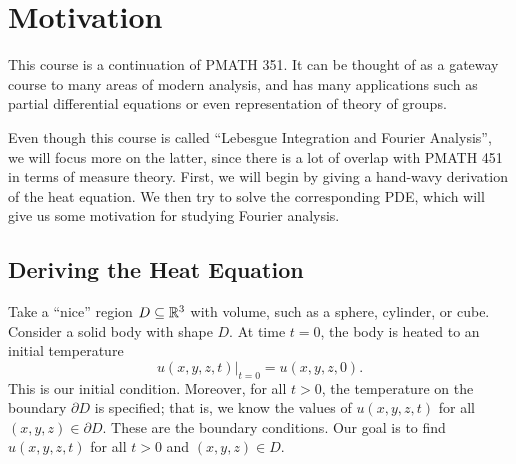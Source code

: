 \section{Motivation}\label{sec:1}
This course is a continuation of PMATH 351. It can be thought of 
as a gateway course to many areas of modern analysis, and has 
many applications such as partial differential equations or even
representation of theory of groups.

Even though this course is called ``Lebesgue Integration and Fourier Analysis'',
we will focus more on the latter, since there is a lot of overlap with 
PMATH 451 in terms of measure theory. First, we will begin by giving a 
hand-wavy derivation of the heat equation. We then try to solve the 
corresponding PDE, which will give us some motivation for studying 
Fourier analysis. 

\subsection{Deriving the Heat Equation}\label{subsec:1.1}
Take a ``nice'' region $D \subseteq \mathbb{R}^3$ with volume, such as a sphere, 
cylinder, or cube. Consider a solid body with shape $D$. At time $t = 0$, 
the body is heated to an initial temperature 
\[ u(x, y, z, t)|_{t=0} = u(x, y, z, 0). \] 
This is our initial condition. Moreover, for all $t > 0$, the temperature on 
the boundary $\partial D$ is specified; that is, we know the values of 
$u(x, y, z, t)$ for all $(x, y, z) \in \partial D$. These are the boundary 
conditions. Our goal is to find $u(x, y, z, t)$ for all $t > 0$ and 
$(x, y, z) \in D$. 

